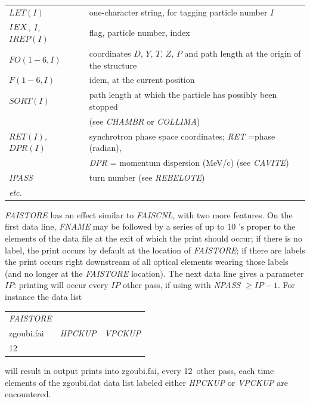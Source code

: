 {\renewcommand{\arraystretch}{1}
 \begin{tabular}{>{\sl}l!{:}l}
	$LET(I) $  & one-character string, for tagging particle number $I$  \\
	$IEX\index{IEX@{\IEX}}$, $I$, $IREP(I)$   &  flag, particle number, index  \\
	 $FO(1-6, I)$  &  coordinates $D$, $Y$, $T$, $Z$, $P$ and path
	                 length at the origin of the structure\\
	 $F(1-6, I)$  &  idem, at the current position\\
     $SORT(I)$ & path length at which the particle has possibly been stopped\\
             & (see \textsl{CHAMBR} or \textsl{COLLIMA})\\
     $RET(I)$, $DPR(I)$ & synchrotron phase space coordinates; \textsl{RET} =phase (radian),\\
           &   \textsl{DPR} = momentum dispersion (MeV/c) (see \textsl{CAVITE}) \\
    \textsl{IPASS}  &  turn number (see \textsl{REBELOTE}) \\
 etc.
     \end{tabular}}
\bigskip

\noindent\textsl{FAISTORE} has an effect similar to \textsl{FAISCNL}, with two 
more features. On the first data line, \textsl{FNAME} may be followed 
by a series of up to 10 \LABEL's proper to the elements of the data 
file at the exit of which the print should occur; if there is no 
label, the print occurs by default at the location of \textsl{FAISTORE}; if there are labels the 
print occurs right downstream of all optical elements wearing those labels
 (and no longer at the \textsl{FAISTORE} location). The next data line 
gives a parameter $IP$: printing will occur every $IP$ other pass, if 
using \REBELOTE{} with \textsl{NPASS} $ \geq IP-1$. For 
instance the data list
\medskip

{\renewcommand{\arraystretch}{1}
\begin{tabular}{lll}
	\textsl{FAISTORE} &  &   \\
	zgoubi.fai \index{zgoubi.fai} & \textsl{HPCKUP} & \textsl{VPCKUP}  \\
	12 &  & 
\end{tabular}}
\medskip

\noindent will result in output prints into zgoubi.fai, every 12~other 
pass, each time elements of the zgoubi.dat  data list labeled either \textsl{HPCKUP}
or \textsl{VPCKUP} are encountered.

